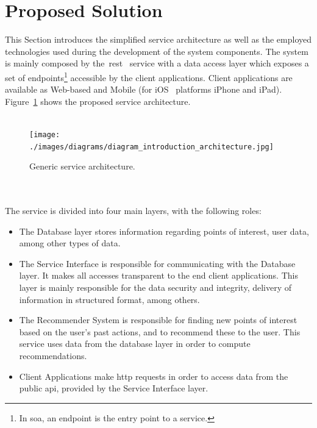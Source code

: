 \section{Proposed Solution}
\label{sec:ftbd}
This Section introduces the simplified service architecture as well as the employed technologies used during the development of the system components. The system is mainly composed by the~\gls{rest}~\cite{RestWebber} service with a data access layer which exposes a set of endpoints\footnote{In \gls{soa}, an endpoint is the entry point to a service.} accessible by the client applications. Client applications are available as Web-based and Mobile (for iOS~\cite{ios} platforms iPhone and iPad). Figure~\ref{fig:introductioArchitecture} shows the proposed service architecture.\\
\\
\begin{figure}[h!]
 \centering
   \texttt{[image: ./images/diagrams/diagram\_introduction\_architecture.jpg]}
   \caption{Generic service architecture.}
   \label{fig:introductioArchitecture}
\end{figure}\\
\\
The service is divided into four main layers, with the following roles:
\begin{itemize}
 \item The Database layer stores information regarding points of interest, user data, among other types of data.
 \item The Service Interface is responsible for communicating with the Database layer. It makes all accesses transparent to the end client applications. This layer is mainly responsible for the data security and integrity, delivery of information in structured format, among others.
 \item The Recommender System is responsible for finding new points of interest based on the user's past actions, and to recommend these to the user. This service uses data from the database layer in order to compute recommendations.
 \item Client Applications make \gls{http} requests in order to access data from the public \gls{api}, provided by the Service Interface layer.
\end{itemize}

